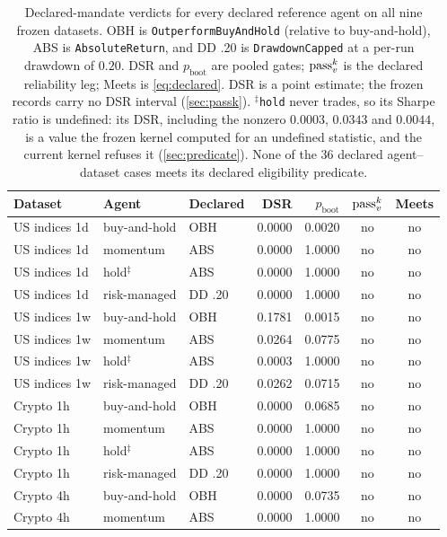 \begin{table}[t]
\centering
\footnotesize
\caption{Declared-mandate verdicts for every declared reference agent on all nine frozen datasets. OBH is \texttt{OutperformBuyAndHold} (relative to buy-and-hold), ABS is \texttt{AbsoluteReturn}, and DD .20 is \texttt{DrawdownCapped} at a per-run drawdown of $0.20$. DSR and $p_{\text{boot}}$ are pooled gates; $\text{pass}^{k}_v$ is the declared reliability leg; Meets is \cref{eq:declared}. DSR is a point estimate; the frozen records carry no DSR interval (\cref{sec:passk}). $^{\ddagger}$\texttt{hold} never trades, so its Sharpe ratio is undefined: its DSR, including the nonzero $0.0003$, $0.0343$ and $0.0044$, is a value the frozen kernel computed for an undefined statistic, and the current kernel refuses it (\cref{sec:predicate}). None of the 36 declared agent--dataset cases meets its declared eligibility predicate.}
\label{tab:mandate}
\setlength{\tabcolsep}{3pt}
\begin{tabular}{lllrrcc}
\toprule
Dataset & Agent & Declared & DSR & $p_{\text{boot}}$ & $\text{pass}^{k}_v$ & Meets \\
\midrule
US indices 1d & buy-and-hold & OBH & 0.0000 & 0.0020 & no & no \\
US indices 1d & momentum & ABS & 0.0000 & 1.0000 & no & no \\
US indices 1d & hold$^{\ddagger}$ & ABS & 0.0000 & 1.0000 & no & no \\
US indices 1d & risk-managed & DD .20 & 0.0000 & 1.0000 & no & no \\
US indices 1w & buy-and-hold & OBH & 0.1781 & 0.0015 & no & no \\
US indices 1w & momentum & ABS & 0.0264 & 0.0775 & no & no \\
US indices 1w & hold$^{\ddagger}$ & ABS & 0.0003 & 1.0000 & no & no \\
US indices 1w & risk-managed & DD .20 & 0.0262 & 0.0715 & no & no \\
Crypto 1h & buy-and-hold & OBH & 0.0000 & 0.0685 & no & no \\
Crypto 1h & momentum & ABS & 0.0000 & 1.0000 & no & no \\
Crypto 1h & hold$^{\ddagger}$ & ABS & 0.0000 & 1.0000 & no & no \\
Crypto 1h & risk-managed & DD .20 & 0.0000 & 1.0000 & no & no \\
Crypto 4h & buy-and-hold & OBH & 0.0000 & 0.0735 & no & no \\
Crypto 4h & momentum & ABS & 0.0000 & 1.0000 & no & no \\

\end{tabular}
\end{table}
